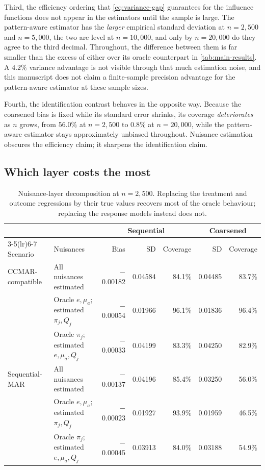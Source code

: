 Third, the efficiency ordering that \cref{eq:variance-gap} guarantees for the
influence functions does not appear in the estimators until the sample is large.
The pattern-aware estimator has the \emph{larger} empirical standard deviation at
$n=2{,}500$ and $n=5{,}000$, the two are level at $n=10{,}000$, and only by
$n=20{,}000$ do they agree to the third decimal. Throughout, the difference
between them is far smaller than the excess of either over its oracle counterpart
in \cref{tab:main-results}. A $4.2\%$ variance advantage is not visible through
that much estimation noise, and this manuscript does not claim a finite-sample
precision advantage for the pattern-aware estimator at these sample sizes.

Fourth, the identification contrast behaves in the opposite way. Because the
coarsened bias is fixed while its standard error shrinks, its coverage
\emph{deteriorates} as $n$ grows, from $56.0\%$ at $n=2{,}500$ to $0.8\%$ at
$n=20{,}000$, while the pattern-aware estimator stays approximately unbiased
throughout. Nuisance estimation obscures the efficiency claim; it sharpens the
identification claim.

\subsection*{Which layer costs the most}

\begin{table}[ht]
\centering
\begin{threeparttable}
\caption{Nuisance-layer decomposition at $n=2{,}500$. Replacing the treatment
and outcome regressions by their true values recovers most of the oracle
behaviour; replacing the response models instead does not.}
\label{tab:crossfit-layers}
\small
\begin{tabular}{@{}llrrrrr@{}}
\toprule
& & \multicolumn{3}{c}{Sequential} & \multicolumn{2}{c}{Coarsened} \\
\cmidrule(lr){3-5}\cmidrule(lr){6-7}
Scenario & Nuisances & Bias & SD & Coverage & SD & Coverage \\
\midrule
CCMAR-compatible & All nuisances estimated & $-$0.00182 & 0.04584 & 84.1\% & 0.04485 & 83.7\% \\
 & Oracle $e,\mu_a$; estimated $\pi_j,Q_j$ & $-$0.00054 & 0.01966 & 96.1\% & 0.01836 & 96.4\% \\
 & Oracle $\pi_j$; estimated $e,\mu_a,Q_j$ & $-$0.00033 & 0.04199 & 83.3\% & 0.04250 & 82.9\% \\
\addlinespace
Sequential-MAR & All nuisances estimated & $-$0.00137 & 0.04196 & 85.4\% & 0.03250 & 56.0\% \\
 & Oracle $e,\mu_a$; estimated $\pi_j,Q_j$ & $-$0.00023 & 0.01927 & 93.9\% & 0.01959 & 46.5\% \\
 & Oracle $\pi_j$; estimated $e,\mu_a,Q_j$ & $-$0.00045 & 0.03913 & 84.0\% & 0.03188 & 54.9\% \\
\bottomrule
\end{tabular}
\end{threeparttable}
\end{table}

